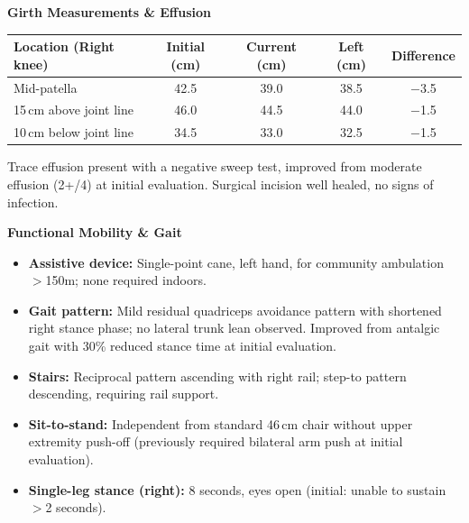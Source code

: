 \documentclass[10pt,letterpaper]{article}
\begin{document}
\vspace{6pt}
\textbf{\color{ptslate}Girth Measurements \& Effusion}

\begin{tabularx}{\linewidth}{@{}Xcccc@{}}
\toprule
\textbf{Location (Right knee)} & \textbf{Initial (cm)} & \textbf{Current (cm)} & \textbf{Left (cm)} & \textbf{Difference} \\
\midrule
Mid-patella & 42.5 & 39.0 & 38.5 & \textcolor{ptgreen}{$-$3.5} \\
15\,cm above joint line & 46.0 & 44.5 & 44.0 & \textcolor{ptgreen}{$-$1.5} \\
10\,cm below joint line & 34.5 & 33.0 & 32.5 & \textcolor{ptgreen}{$-$1.5} \\
\bottomrule
\end{tabularx}
\par\vspace{2pt}
{\footnotesize\color{ptslate}Trace effusion present with a negative sweep test, improved from moderate effusion (2+/4) at initial evaluation. Surgical incision well healed, no signs of infection.}

\vspace{4pt}
\textbf{\color{ptslate}Functional Mobility \& Gait}

\begin{itemize}[leftmargin=16pt,itemsep=1pt,topsep=2pt]
  \item \textbf{Assistive device:} Single-point cane, left hand, for community ambulation $>$150m; none required indoors.
  \item \textbf{Gait pattern:} Mild residual quadriceps avoidance pattern with shortened right stance phase; no lateral trunk lean observed. Improved from antalgic gait with 30\% reduced stance time at initial evaluation.
  \item \textbf{Stairs:} Reciprocal pattern ascending with right rail; step-to pattern descending, requiring rail support.
  \item \textbf{Sit-to-stand:} Independent from standard 46\,cm chair without upper extremity push-off (previously required bilateral arm push at initial evaluation).
  \item \textbf{Single-leg stance (right):} 8 seconds, eyes open (initial: unable to sustain $>$2 seconds).
\end{itemize}
\end{document}
